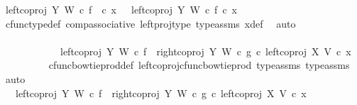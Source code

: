 \begin{isabellebody}
\ {\isachardoublequoteopen}left{\isacharunderscore}{\kern0pt}coproj\ Y\ W\ {\isasymcirc}\isactrlsub c\ f\ \ {\isasymcirc}\isactrlsub c\ x{}\ \ {\isacharequal}{\kern0pt}\ {\isacharparenleft}{\kern0pt}left{\isacharunderscore}{\kern0pt}coproj\ Y\ W\ {\isasymcirc}\isactrlsub c\ f{\isacharparenright}{\kern0pt}\ {\isasymcirc}\isactrlsub c\ x{}{\isachardoublequoteclose}\isanewline
\ \ \ \ \ \ \ \ \ \ \ \ \isamarkupfalse%
\ cfunc{\isacharunderscore}{\kern0pt}type{\isacharunderscore}{\kern0pt}def\ comp{\isacharunderscore}{\kern0pt}associative\ left{\isacharunderscore}{\kern0pt}proj{\isacharunderscore}{\kern0pt}type\ type{\isacharunderscore}{\kern0pt}assms{\isacharparenleft}{\kern0pt}{}{\isacharparenright}{\kern0pt}\ x{}{\isacharunderscore}{\kern0pt}def\ \isamarkupfalse%
\ auto\ \ \ \ \ \ \ \ \ \ \ \ \isanewline
\ \ \ \ \ \ \isamarkupfalse%
\ \isamarkupfalse%
\ {\isachardoublequoteopen}{\isachardot}{\kern0pt}{\isachardot}{\kern0pt}{\isachardot}{\kern0pt}\ {\isacharequal}{\kern0pt}\ \isanewline
\ \ \ \ \ \ \ \ \ \ \ \ {\isacharparenleft}{\kern0pt}{\isacharparenleft}{\kern0pt}{\isacharparenleft}{\kern0pt}left{\isacharunderscore}{\kern0pt}coproj\ Y\ W\ {\isasymcirc}\isactrlsub c\ f{\isacharparenright}{\kern0pt}\ {\isasymamalg}\ {\isacharparenleft}{\kern0pt}right{\isacharunderscore}{\kern0pt}coproj\ Y\ W\ {\isasymcirc}\isactrlsub c\ g{\isacharparenright}{\kern0pt}{\isacharparenright}{\kern0pt}\ {\isasymcirc}\isactrlsub c\ left{\isacharunderscore}{\kern0pt}coproj\ X\ V{\isacharparenright}{\kern0pt}\ {\isasymcirc}\isactrlsub c\ x{}{\isachardoublequoteclose}\isanewline
\ \ \ \ \ \ \ \ \isamarkupfalse%
\ cfunc{\isacharunderscore}{\kern0pt}bowtie{\isacharunderscore}{\kern0pt}prod{\isacharunderscore}{\kern0pt}def{}\ left{\isacharunderscore}{\kern0pt}coproj{\isacharunderscore}{\kern0pt}cfunc{\isacharunderscore}{\kern0pt}bowtie{\isacharunderscore}{\kern0pt}prod\ type{\isacharunderscore}{\kern0pt}assms{\isacharparenleft}{\kern0pt}{}{\isacharparenright}{\kern0pt}\ type{\isacharunderscore}{\kern0pt}assms{\isacharparenleft}{\kern0pt}{}{\isacharparenright}{\kern0pt}\ \isamarkupfalse%
\ auto\isanewline
\ \ \ \ \ \ \isamarkupfalse%
\ \isamarkupfalse%
\ {\isachardoublequoteopen}{\isachardot}{\kern0pt}{\isachardot}{\kern0pt}{\isachardot}{\kern0pt}\ {\isacharequal}{\kern0pt}\ {\isacharparenleft}{\kern0pt}{\isacharparenleft}{\kern0pt}left{\isacharunderscore}{\kern0pt}coproj\ Y\ W\ {\isasymcirc}\isactrlsub c\ f{\isacharparenright}{\kern0pt}\ {\isasymamalg}\ {\isacharparenleft}{\kern0pt}right{\isacharunderscore}{\kern0pt}coproj\ Y\ W\ {\isasymcirc}\isactrlsub c\ g{\isacharparenright}{\kern0pt}{\isacharparenright}{\kern0pt}\ {\isasymcirc}\isactrlsub c\ left{\isacharunderscore}{\kern0pt}coproj\ X\ V\ {\isasymcirc}\isactrlsub c\ x{}{\isachardoublequoteclose}\isanewline

\end{isabellebody}
